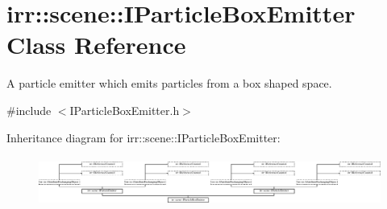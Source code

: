 \hypertarget{classirr_1_1scene_1_1IParticleBoxEmitter}{}\section{irr\+:\+:scene\+:\+:I\+Particle\+Box\+Emitter Class Reference}
\label{classirr_1_1scene_1_1IParticleBoxEmitter}


A particle emitter which emits particles from a box shaped space.  




{\ttfamily \#include $<$I\+Particle\+Box\+Emitter.\+h$>$}

Inheritance diagram for irr\+:\+:scene\+:\+:I\+Particle\+Box\+Emitter\+:\begin{figure}[H]
\begin{center}
\leavevmode
\includegraphics[height=1.682692cm]{classirr_1_1scene_1_1IParticleBoxEmitter}
\end{center}
\end{figure}
